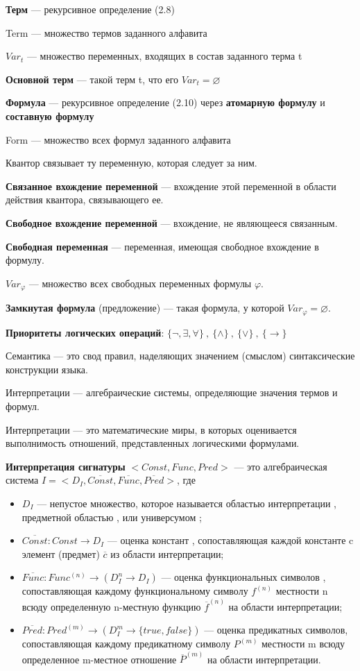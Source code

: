\documentclass[a4paper,12pt]{article}
\begin{document}
\textbf{Терм} --- рекурсивное определение (2.8)

Term --- множество термов заданного алфавита

\textbf{$Var_t$} --- множество переменных, входящих в состав заданного терма t

\textbf{Основной терм} --- такой терм t, что его $Var_t = \varnothing$

\textbf{Формула} --- рекурсивное определение (2.10) через \textbf{атомарную формулу} и \textbf{составную формулу}

Form --- множество всех формул заданного алфавита

Квантор связывает ту переменную, которая следует за ним.

\textbf{Связанное вхождение переменной} --- вхождение этой переменной в области действия квантора, связывающего ее.

\textbf{Свободное вхождение переменной} --- вхождение, не являющееся связанным.

\textbf{Свободная переменная} --- переменная, имеющая свободное вхождение в формулу.

\textbf{$Var_{\varphi}$} --- множество всех свободных переменных формулы $\varphi$.

\textbf{Замкнутая формула} (предложение) --- такая формула, у которой $Var_{\varphi} = \varnothing$.

\textbf{Приоритеты логических операций}: $\{\neg ,\exists ,\forall\}~,~\{\wedge\}~,~\{\vee\}~,~\{\rightarrow\}$

Семантика --- это свод правил, наделяющих значением (смыслом) синтаксические конструкции языка.

Интерпретации --- алгебраические системы, определяющие значения термов и формул.

Интерпретации --- это математические миры, в которых оценивается выполнимость отношений, представленных логическими формулами.

\textbf{Интерпретация сигнатуры} $<Const, Func, Pred>$ --- это алгебраическая система $I = < D_I , \overline{Const}, \overline{Func}, \overline{Pred} >$, где
\begin{itemize}
 \item $D_I$ --- непустое множество, которое называется областью интерпретации , предметной областью , или универсумом ;
 \item $\overline{Const} : Const \rightarrow D_I$ --- оценка констант , сопоставляющая каждой константе c элемент (предмет) $\overline{c}$ из области интерпретации;
 \item $\overline{Func} : Func^{(n)} \rightarrow (D_I^n \rightarrow D_I )$ --- оценка функциональных символов , сопоставляющая каждому функциональному символу $f^{(n)}$ местности n всюду определенную n-местную функцию $\overline{f}^{(n)}$ на области   интерпретации;
 \item $\overline{Pred} : Pred^{(m)} \rightarrow (D_I^m \rightarrow \{true, false\})$ --- оценка предикатных символов, сопоставляющая каждому предикатному символу $P^{(m)}$ местности m всюду определенное m-местное отношение $\overline{P}^{(m)}$ на области интерпретации.
\end{itemize}
\end{document}

